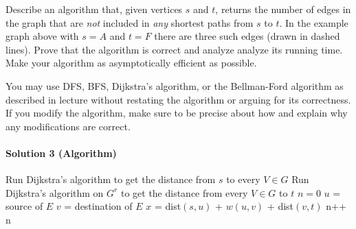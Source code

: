 \documentclass[11pt]{article}
\begin{document}
\begin{figure}[!h]
\centering
{}
\end{figure}

Describe an algorithm that, given vertices $s$ and $t$, returns the number of edges in the graph that are \textit{not} included in \textit{any} shortest paths from $s$ to $t$. In the example graph above with $s=A$ and $t=F$ there are three such edges (drawn in dashed lines). Prove that the algorithm is correct and analyze analyze its running time. Make your algorithm as asymptotically efficient as possible.

You may use DFS, BFS, Dijkstra's algorithm, or the Bellman-Ford algorithm as described in lecture without restating the algorithm or arguing for its correctness. If you modify the algorithm, make sure to be precise about how and explain why any modifications are correct.

\paragraph{Solution 3 (Algorithm)}

\begin{algorithmic}[1]
        \State Run Dijkstra's algorithm to get the distance from $s$ to every $V \in G$
        \State Run Dijkstra's algorithm on $G^r$ to get the distance from every $V \in G$ to $t$
        \State $n = 0$
            \State $u$ = source of $E$
            \State $v$ = destination of $E$
            \State $x$ = dist$(s, u)$ + $w(u, v)$ + dist$(v, t)$ 
                \State n++
            \EndIf
        \EndFor
        \State \Return n
    \EndProcedure
\end{algorithmic}
\end{document}

